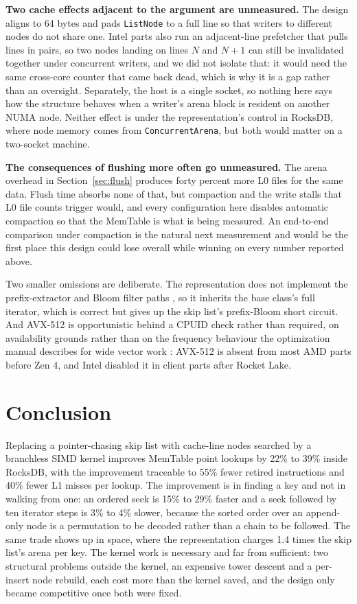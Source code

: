\documentclass[conference]{IEEEtran}
\begin{document}
\textbf{Two cache effects adjacent to the argument are unmeasured.} The design
aligns to 64 bytes and pads \texttt{ListNode} to a full line so that writers to
different nodes do not share one. Intel parts also run an adjacent-line prefetcher
that pulls lines in pairs, so two nodes landing on lines $N$ and $N{+}1$ can still
be invalidated together under concurrent writers, and we did not isolate that: it
would need the same cross-core counter that came back dead, which is why it is a
gap rather than an oversight. Separately, the host is a single socket, so nothing
here says how the structure behaves when a writer's arena block is resident on
another NUMA node. Neither effect is under the representation's control in RocksDB,
where node memory comes from \texttt{ConcurrentArena}, but both would matter on a
two-socket machine.

\textbf{The consequences of flushing more often go unmeasured.} The arena
overhead in Section~\ref{sec:flush} produces forty percent more L0 files for the
same data. Flush time absorbs none of that, but compaction and the write stalls
that L0 file counts trigger would, and every configuration here disables automatic
compaction so that the MemTable is what is being measured. An end-to-end comparison
under compaction is the natural next measurement and would be the first place this
design could lose overall while winning on every number reported above.

Two smaller omissions are deliberate. The representation does not implement the
prefix-extractor and Bloom filter paths \cite{bloom1970,dayan2017monkey}, so it
inherits the base class's full iterator, which is correct but gives up the skip
list's prefix-Bloom short circuit. And AVX-512 is opportunistic behind a CPUID
check rather than required, on availability grounds rather than on the frequency
behaviour the optimization manual describes for wide vector work
\cite{intel-optimization}: AVX-512 is absent from most AMD parts before Zen 4, and
Intel disabled it in client parts after Rocket Lake.

\section{Conclusion}

Replacing a pointer-chasing skip list with cache-line nodes searched by a
branchless SIMD kernel improves MemTable point lookups by 22\% to 39\% inside
RocksDB, with the improvement traceable to 55\% fewer retired instructions and
40\% fewer L1 misses per lookup. The improvement is in finding a key and not in
walking from one: an ordered seek is 15\% to 29\% faster and a seek followed by ten
iterator steps is 3\% to 4\% slower, because the sorted order over an append-only
node is a permutation to be decoded rather than a chain to be followed. The same
trade shows up in space, where the representation charges 1.4 times the skip list's
arena per key. The kernel work is necessary and far from
sufficient: two structural problems outside the kernel, an expensive tower descent
and a per-insert node rebuild, each cost more than the kernel saved, and the
design only became competitive once both were fixed.
\end{document}
